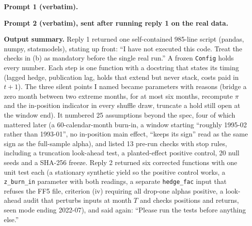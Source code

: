 \textbf{Prompt 1 (verbatim).}
\begin{promptbox}

\end{promptbox}

\textbf{Prompt 2 (verbatim), sent after running reply 1 on the real data.}
\begin{promptbox}

\end{promptbox}

\textbf{Output summary.} Reply 1 returned one self-contained 985-line script (pandas, numpy, statsmodels), stating up front: ``I have not executed this code. Treat the checks in (b) as mandatory before the single real run.'' A frozen \texttt{Config} holds every number. Each step is one function with a docstring that states its timing (lagged hedge, publication lag, holds that extend but never stack, costs paid in $t+1$). The three silent points I named became parameters with reasons (bridge a zero month between two extreme months, for at most six months, recompute $\pi$ and the in-position indicator in every shuffle draw, truncate a hold still open at the window end). It numbered 25 assumptions beyond the spec, four of which mattered later (a 60-calendar-month burn-in, a window starting ``roughly 1995-02 rather than 1993-01'', no in-position main effect, ``keeps its sign'' read as the same sign as the full-sample alpha), and listed 13 pre-run checks with stop rules, including a truncation look-ahead test, a planted-effect positive control, 20 null seeds and a SHA-256 freeze. Reply 2 returned six corrected functions with one unit test each (a stationary synthetic yield so the positive control works, a \texttt{z\_burn\_in} parameter with both readings, a separate \texttt{hedge\_fac} input that refuses the FF5 file, criterion (iv) requiring all drop-one alphas positive, a look-ahead audit that perturbs inputs at month $T$ and checks positions and returns, seen mode ending 2022-07), and said again: ``Please run the tests before anything else.''

